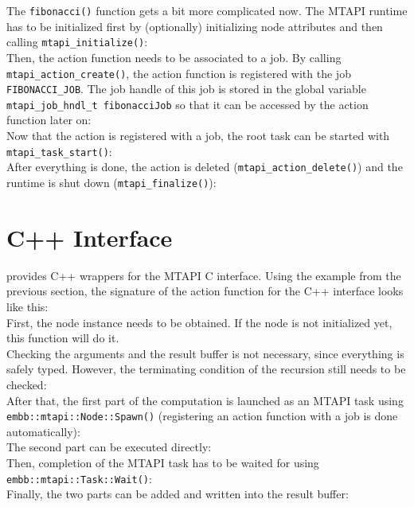 The \lstinline|fibonacci()| function gets a bit more complicated now. The MTAPI runtime has to be initialized first by (optionally) initializing node attributes and then calling \lstinline|mtapi_initialize()|:
%
\\
%
Then, the action function needs to be associated to a job. By calling \lstinline|mtapi_action_create()|, the action function is registered with the job \lstinline|FIBONACCI_JOB|. The job handle of this job is stored in the global variable \lstinline|mtapi_job_hndl_t fibonacciJob| so that it can be accessed by the action function later on:
%
\\
%
Now that the action is registered with a job, the root task can be started with \lstinline|mtapi_task_start()|:
%
\\
%
After everything is done, the action is deleted (\lstinline|mtapi_action_delete()|) and the runtime is shut down (\lstinline|mtapi_finalize()|):
%
\\
%

\section{C++ Interface}
\label{sec:mtapi_cpp_interface}

\embb provides C++ wrappers for the MTAPI C interface. Using the example from the previous section, the signature of the action function for the C++ interface looks like this:
%
\\
%
First, the node instance needs to be obtained. If the node is not initialized yet, this function will do it.
%
\\
%
Checking the arguments and the result buffer is not necessary, since everything is safely typed. However, the terminating condition of the recursion still needs to be checked:
%
\\
%
After that, the first part of the computation is launched as an MTAPI task using \lstinline|embb::mtapi::Node::Spawn()| (registering an action function with a job is done automatically):
%
\\
%
The second part can be executed directly:
%
\\
%
Then, completion of the MTAPI task has to be waited for using \lstinline|embb::mtapi::Task::Wait()|:
%
\\
%
Finally, the two parts can be added and written into the result buffer:
%
\\
% 

